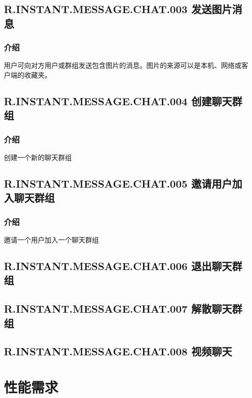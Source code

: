 	
\subsection{R.INSTANT.MESSAGE.CHAT.003 发送图片消息}
\subsubsection{介绍}
用户可向对方用户或群组发送包含图片的消息。图片的来源可以是本机、网络或客户端的收藏夹。

\subsection{R.INSTANT.MESSAGE.CHAT.004 创建聊天群组}
\subsubsection{介绍}
创建一个新的聊天群组

\subsection{R.INSTANT.MESSAGE.CHAT.005 邀请用户加入聊天群组}
\subsubsection{介绍}
邀请一个用户加入一个聊天群组

\subsection{R.INSTANT.MESSAGE.CHAT.006 退出聊天群组}
\subsection{R.INSTANT.MESSAGE.CHAT.007 解散聊天群组}

\subsection{R.INSTANT.MESSAGE.CHAT.008 视频聊天}




\section{性能需求}

